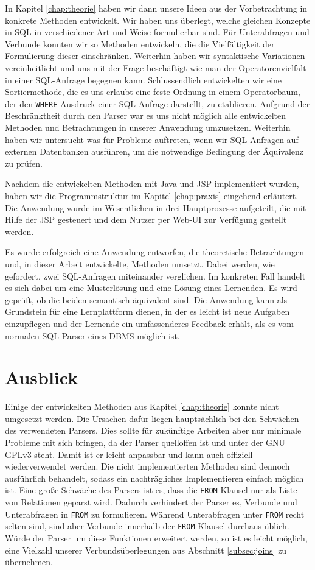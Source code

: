 In Kapitel \ref{chap:theorie} haben wir dann unsere Ideen aus der Vorbetrachtung in konkrete Methoden entwickelt. Wir haben uns überlegt, welche gleichen Konzepte in SQL in verschiedener Art und Weise formulierbar sind. Für Unterabfragen und Verbunde konnten wir so Methoden entwickeln, die die Vielfältigkeit der Formulierung dieser einschränken. Weiterhin haben wir syntaktische Variationen vereinheitlicht und uns mit der Frage beschäftigt wie man der Operatorenvielfalt in einer SQL-Anfrage begegnen kann. Schlussendlich entwickelten wir eine Sortiermethode, die es uns erlaubt eine feste Ordnung in einem Operatorbaum, der den \verb|WHERE|-Ausdruck einer SQL-Anfrage darstellt, zu etablieren. Aufgrund der Beschränktheit durch den Parser war es uns nicht möglich alle entwickelten Methoden und Betrachtungen in unserer Anwendung umzusetzen. Weiterhin haben wir untersucht was für Probleme auftreten, wenn wir SQL-Anfragen auf externen Datenbanken ausführen, um die notwendige Bedingung der Äquivalenz zu prüfen.

Nachdem die entwickelten Methoden mit Java und JSP implementiert wurden, haben wir die Programmstruktur im Kapitel \ref{chap:praxis} eingehend erläutert. Die Anwendung wurde im Wesentlichen in drei Hauptprozesse aufgeteilt, die mit Hilfe der JSP gesteuert und dem Nutzer per Web-UI zur Verfügung gestellt werden. 

Es wurde erfolgreich eine Anwendung entworfen, die theoretische Betrachtungen und, in dieser Arbeit entwickelte, Methoden umsetzt. Dabei werden, wie gefordert, zwei SQL-Anfragen miteinander verglichen. Im konkreten Fall handelt es sich dabei um eine Musterlösung und eine Lösung eines Lernenden. Es wird geprüft, ob die beiden semantisch äquivalent sind. Die Anwendung kann als Grundstein für eine Lernplattform dienen, in der es leicht ist neue Aufgaben einzupflegen und der Lernende ein umfassenderes Feedback erhält, als es vom normalen SQL-Parser eines DBMS möglich ist.

\section{Ausblick}

Einige der entwickelten Methoden aus Kapitel \ref{chap:theorie} konnte nicht umgesetzt werden. Die Ursachen dafür liegen hauptsächlich bei den Schwächen des verwendeten Parsers. Dies sollte für zukünftige Arbeiten aber nur minimale Probleme mit sich bringen, da der Parser quelloffen ist und unter der GNU GPLv3 steht. Damit ist er leicht anpassbar und kann auch offiziell wiederverwendet werden. Die nicht implementierten Methoden sind dennoch ausführlich behandelt, sodass ein nachträgliches Implementieren einfach möglich ist. Eine große Schwäche des Parsers ist es, dass die \verb|FROM|-Klausel nur als Liste von Relationen geparst wird. Dadurch verhindert der Parser es, Verbunde und Unterabfragen in \verb|FROM| zu formulieren. Während Unterabfragen unter \verb|FROM| recht selten sind, sind aber Verbunde innerhalb der \verb|FROM|-Klausel durchaus üblich. Würde der Parser um diese Funktionen erweitert werden, so ist es leicht möglich, eine Vielzahl unserer Verbundsüberlegungen aus Abschnitt \ref{subsec:joins} zu übernehmen.

